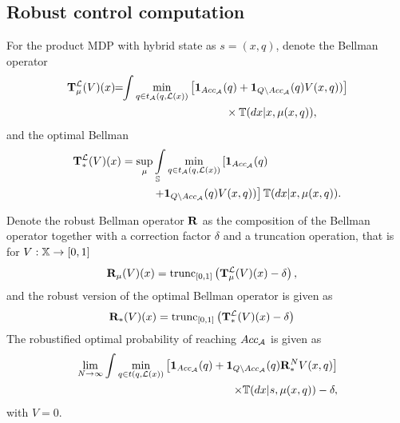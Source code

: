 \documentclass{ifacconf}
\begin{document}
\subsection{Robust control computation}

For the product MDP with hybrid state as $s=(x, q)$, denote the Bellman operator
\begin{align}\label{eq:V_recopt_inf}
& \Bel_\mu^\Labset (V)(x) \!\!=\!\!\int%
\min_{\bar q \in t_\FSA(q, \Labset(\bar x))}\left[\mathbf 1_{Acc_\FSA}(\bar q)+  \mathbf 1_{Q\setminus Acc_\FSA}(\bar q)V(\bar x,\bar q))\right]\notag\\&\hspace{5cm}\hfill \times{\mathbb{T}}(d\bar x|x,\mu(x,q)),
\end{align}
and the optimal Bellman 
\begin{align}\label{eq:V_recopt_inf}
& \Bel_\ast^\Labset (V)(x) =\sup_\mu\int_{\S}\min_{\bar q \in t_\FSA(q, \Labset(\bar x))}\left[\mathbf 1_{Acc_\FSA}(\bar q)\right.\hspace{1.5cm}\\&\left.\hspace{2.5cm}+  \mathbf 1_{Q\setminus Acc_\FSA}(\bar q)V(\bar x,\bar q))\right]\notag {\mathbb{T}}(d\bar x|x,\mu(x,q)).
\end{align}



Denote the robust Bellman operator ${\mathbf {R}}$ as the composition of the Bellman operator together with a correction factor $\delta$ and  a truncation operation, that is for $V:{\mathbb{X}}\rightarrow [0,1]$
\begin{align}\label{eq:V_recopt_inf}
& {\mathbf {R}}_\mu (V)(x) = \mathop{\mathrm{trunc}}\nolimits_{[0,1]}\left({\mathbf {T}}_\mu^{\mathcal{L}} (V)(x)-\delta\right),
\end{align}
and the robust version of the optimal Bellman operator is given as 
\begin{align}\label{eq:V_recopt_inf}
& {\mathbf {R}}_\ast (V)(x)= \mathop{\mathrm{trunc}}\nolimits_{[0,1]}\left({\mathbf {T}}_\ast^{\mathcal{L}} (V)(x)-\delta\right)
\end{align}
The robustified optimal probability of reaching $Acc_{\mathcal{A}}$ is given as
\begin{align}
	\lim_{N\rightarrow \infty}\int \min_{\bar q \in t(q,\Labset(\bar x))}\left[\mathbf 1_{Acc_\FSA }(\bar q)+ \mathbf 1_{Q \setminus Acc_\FSA }(\bar q) \BelR^N_\ast V(\bar x, \bar q)\right]\notag\\\times\bar{\mathbb{T}} (d\bar x|s,\mu(x,q))-\delta,
\end{align}
with $V=0$.
\end{document}
